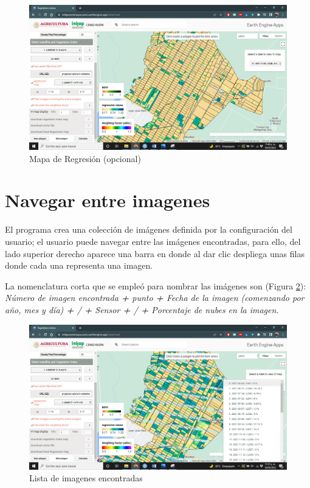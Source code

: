 \documentclass[
]{book}
\begin{document}
\begin{figure}

{\centering \includegraphics[width=0.85\linewidth]{./images/Figure54} 

}

\caption{Mapa de Regresión (opcional)}\label{fig:figI4}
\end{figure}

\hypertarget{navegar-entre-imagenes}{%
\section{Navegar entre imagenes}\label{navegar-entre-imagenes}}

El programa crea una colección de imágenes definida por la configuración del usuario; el usuario puede navegar entre las imágenes encontradas, para ello, del lado superior derecho aparece una barra en donde al dar clic despliega unas filas donde cada una representa una imagen.

La nomenclatura corta que se empleó para nombrar las imágenes son (Figura \ref{fig:figI5}): \emph{Número de imagen encontrada \textbf{+} punto \textbf{+} Fecha de la imagen (comenzando por año, mes y día) \textbf{+} / \textbf{+} Sensor \textbf{+} / \textbf{+} Porcentaje de nubes en la imagen.}

\begin{figure}

{\centering \includegraphics[width=0.85\linewidth]{./images/Figure55} 

}

\caption{Lista de imagenes encontradas}\label{fig:figI5}
\end{figure}
\end{document}
